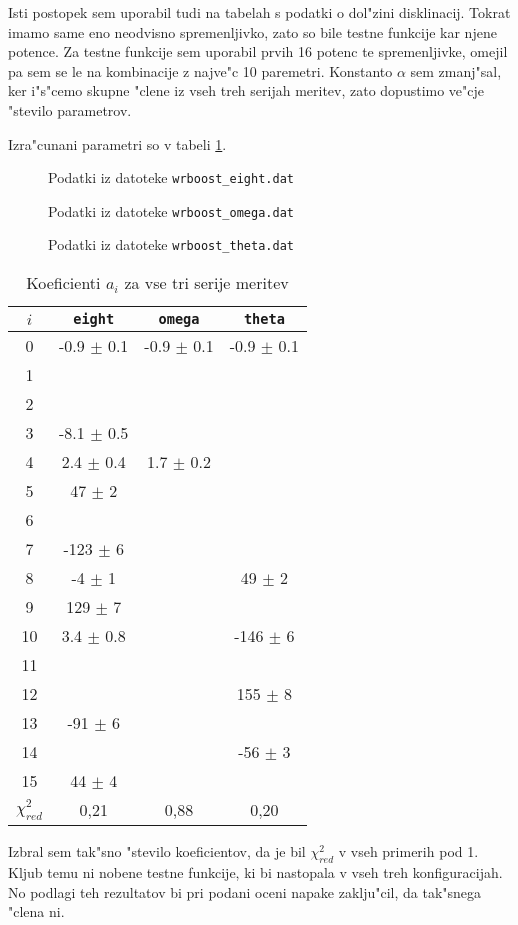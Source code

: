 \documentclass[a4paper,10pt]{article}
\newcommand{\slika}[2]{
\begin{figure}[h]
 
  \caption{#2}
  \label{fig:#1}
\end{figure}
}
\begin{document}
Isti postopek sem uporabil tudi na tabelah s podatki o dol"zini disklinacij. Tokrat imamo same eno neodvisno spremenljivko, zato so bile testne funkcije kar njene potence. Za testne funkcije sem uporabil prvih 16 potenc te spremenljivke, omejil pa sem se le na kombinacije z najve"c 10 paremetri. Konstanto $\alpha$ sem zmanj"sal, ker i"s"cemo skupne "clene iz vseh treh serijah meritev, zato dopustimo ve"cje "stevilo parametrov. 


Izra"cunani parametri so v tabeli \ref{tab:wrboost}. 

\slika{kris-e}{Podatki iz datoteke \texttt{wrboost\_eight.dat}}
\slika{kris-o}{Podatki iz datoteke \texttt{wrboost\_omega.dat}}
\slika{kris-t}{Podatki iz datoteke \texttt{wrboost\_theta.dat}}

\begin{table}
 \centering
\begin{tabular}{|c|c|c|c|}
\hline
$i$ & \texttt{eight} & \texttt{omega} & \texttt{theta} \\
\hline
0 & -0.9 $\pm$ 0.1 & -0.9 $\pm$ 0.1 & -0.9 $\pm$ 0.1 \\
1 & & & \\
2 & & & \\
3 & -8.1 $\pm$ 0.5 & & \\
4 & 2.4 $\pm$ 0.4 & 1.7 $\pm$ 0.2 & \\
5 & 47 $\pm$ 2 & & \\
6 & & & \\
7 & -123 $\pm$ 6 & & \\
8 & -4 $\pm$ 1 & & 49 $\pm$ 2 \\
9 & 129 $\pm$ 7 & &  \\
10 & 3.4 $\pm$ 0.8 & & -146 $\pm$ 6 \\
11 & & & \\
12 & & & 155 $\pm$ 8 \\
13 & -91 $\pm$ 6 & & \\
14 & & & -56 $\pm$ 3 \\
15 & 44 $\pm$ 4 & & \\
\hline
$\chi^2_{red}$ & 0,21 & 0,88 & 0,20 \\
\hline

\end{tabular}
\caption{Koeficienti $a_i$ za vse tri serije meritev}
\label{tab:wrboost}
\end{table}

Izbral sem tak"sno "stevilo koeficientov, da je bil $\chi^2_{red}$ v vseh primerih pod 1. Kljub temu ni nobene testne funkcije, ki bi nastopala v vseh treh konfiguracijah. No podlagi teh rezultatov bi pri podani oceni napake zaklju"cil, da tak"snega "clena ni. 
\end{document}

